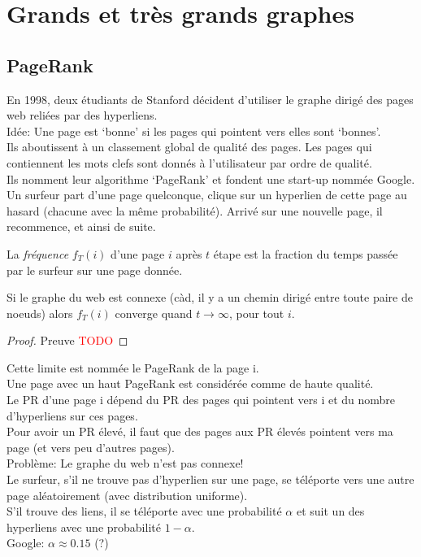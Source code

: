 \section{Grands et très grands graphes}
\subsection{PageRank}
En 1998, deux étudiants de Stanford décident d’utiliser le graphe dirigé des pages web reliées par des hyperliens.\\
Idée: Une page est ‘bonne’ si les pages qui pointent vers elles sont ‘bonnes’.\\
Ils aboutissent à un classement global de qualité des pages. Les pages qui contiennent les mots clefs sont donnés à l’utilisateur par ordre de qualité.\\
Ils nomment leur algorithme ‘PageRank’ et fondent une start-up nommée Google. \\
Un surfeur part d’une page quelconque, clique sur un hyperlien de cette page au hasard (chacune avec la même probabilité). Arrivé sur une nouvelle page, il recommence, et ainsi de suite.\\
\begin{mydef}
  La \emph{fréquence} $f_T(i)$ d’une page $i$ après $t$ étape est la fraction du temps passée par le surfeur sur une page donnée.
\end{mydef}

\begin{mytheo}
  Si le graphe du web est connexe (càd, il y a un chemin dirigé entre toute paire de noeuds) alors $f_T(i)$ converge quand $t \to ∞$, pour tout $i$.
  \begin{proof}
     Preuve \textcolor{red}{TODO}
  \end{proof}
\end{mytheo}

Cette limite est nommée le PageRank de la page i.\\
Une page avec un haut PageRank est considérée comme de haute qualité.\\
Le PR d’une page i dépend du PR des pages qui pointent vers i et du nombre d’hyperliens sur ces pages.\\
Pour avoir un PR élevé, il faut que des pages aux PR élevés pointent vers ma page (et vers peu d’autres pages).\\
\newline
Problème: Le graphe du web n’est pas connexe!\\
Le surfeur, s’il ne trouve pas d’hyperlien sur une page, se téléporte vers une autre page aléatoirement (avec distribution uniforme).\\
S’il trouve des liens, il se téléporte avec une probabilité $\alpha$ et suit un des hyperliens avec une probabilité $1 − \alpha$.\\
Google: $\alpha ≈ 0.15$ (?)